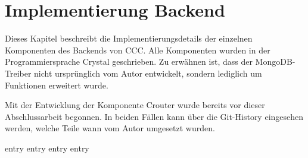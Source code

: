 \chapter{Implementierung Backend}
\label{chap:implementierung_backend}

Dieses Kapitel beschreibt die Implementierungsdetails der einzelnen Komponenten
des Backends von CCC.  Alle Komponenten wurden in der Programmiersprache
Crystal geschrieben.  Zu erwähnen ist, dass der MongoDB-Treiber nicht
ursprünglich vom Autor entwickelt, sondern lediglich um Funktionen erweitert
wurde.

Mit der Entwicklung der Komponente Crouter wurde bereits vor dieser
Abschlussarbeit begonnen.  In beiden Fällen kann über die Git-History
eingesehen werden, welche Teile wann vom Autor umgesetzt wurden.

{entry}
{entry}
{entry}
{entry}
